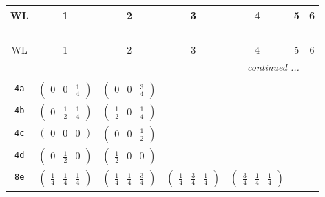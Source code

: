 \documentclass[fleqn,9pt,landscape]{jsarticle}
\begin{document}
\begin{center}
\renewcommand{\arraystretch}{1.2}
\begin{longtable}{ccccccc}
 \hline \hline
WL & 1 & 2 & 3 & 4 & 5 & 6 \\ \hline \endfirsthead

\multicolumn{6}{l}{\tablename\ \thetable{}} \\
 \hline \hline
WL & 1 & 2 & 3 & 4 & 5 & 6 \\ \hline \endhead

 \hline \hline
\multicolumn{6}{r}{\footnotesize\it continued ...} \\ \endfoot

 \hline \hline
\multicolumn{6}{r}{} \\ \endlastfoot

{\tt 4a} & $ \begin{pmatrix} 0 & 0 & \frac{1}{4} \end{pmatrix} $ & $ \begin{pmatrix} 0 & 0 & \frac{3}{4} \end{pmatrix} $ & $  $ & $  $ & $  $ & $  $ \\ \hline
{\tt 4b} & $ \begin{pmatrix} 0 & \frac{1}{2} & \frac{1}{4} \end{pmatrix} $ & $ \begin{pmatrix} \frac{1}{2} & 0 & \frac{1}{4} \end{pmatrix} $ & $  $ & $  $ & $  $ & $  $ \\ \hline
{\tt 4c} & $ \begin{pmatrix} 0 & 0 & 0 \end{pmatrix} $ & $ \begin{pmatrix} 0 & 0 & \frac{1}{2} \end{pmatrix} $ & $  $ & $  $ & $  $ & $  $ \\ \hline
{\tt 4d} & $ \begin{pmatrix} 0 & \frac{1}{2} & 0 \end{pmatrix} $ & $ \begin{pmatrix} \frac{1}{2} & 0 & 0 \end{pmatrix} $ & $  $ & $  $ & $  $ & $  $ \\ \hline
{\tt 8e} & $ \begin{pmatrix} \frac{1}{4} & \frac{1}{4} & \frac{1}{4} \end{pmatrix} $ & $ \begin{pmatrix} \frac{1}{4} & \frac{1}{4} & \frac{3}{4} \end{pmatrix} $ & $ \begin{pmatrix} \frac{1}{4} & \frac{3}{4} & \frac{1}{4} \end{pmatrix} $ & $ \begin{pmatrix} \frac{3}{4} & \frac{1}{4} & \frac{1}{4} \end{pmatrix} $ & $  $ & $  $ \\ \hline

\end{longtable}
\end{center}
\end{document}
